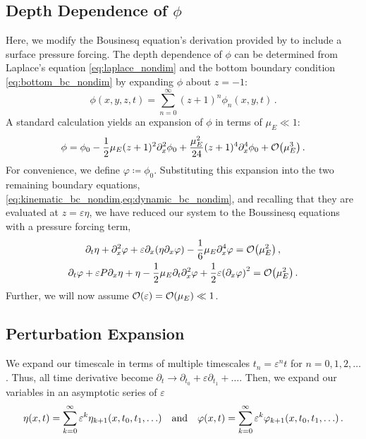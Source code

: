 \documentclass{jfm}
\renewcommand*{\epsilon}{\varepsilon}
\begin{document}
\subsection{Depth Dependence of \texorpdfstring{$\phi$}{Velocity Potential}}
Here, we modify the Bousinesq equation's derivation provided by
\citet{mei2005nonlinear} to include a surface pressure forcing.
The depth dependence of $\phi$ can be determined from Laplace's equation
\cref{eq:laplace_nondim} and the bottom boundary condition
\cref{eq:bottom_bc_nondim} by expanding $\phi$ about $z=-1$:
\begin{equation}
  \phi(x,y,z,t) = \sum_{n=0}^\infty (z+1)^n\phi_n(x,y,t) \,.
\end{equation}
A standard calculation \citep[\eg][]{mei2005nonlinear} yields an
expansion of $\phi$ in terms of $\mu_E \ll 1$:
\begin{equation}
  \phi = \phi_0 - \frac{1}{2}\mu_E (z+1)^2\partial^2_x\phi_0 +
  \frac{\mu_E^2}{24}(z+1)^4\partial^4_x\phi_0 +
  \order{\mu_E^3} \,.
\end{equation}
For convenience, we define $\varphi \coloneqq \phi_0$.
Substituting this expansion into the two remaining boundary equations,
\cref{eq:kinematic_bc_nondim,eq:dynamic_bc_nondim}, and recalling that
they are evaluated at $z=\epsilon \eta$, we have reduced our system to
the Boussinesq equations with a pressure forcing term,
\begin{gather}
  \partial_t \eta + \partial_x^2 \varphi + \epsilon \partial_x
    \pqty{\eta \partial_x \varphi} -\frac{1}{6}\mu_E \partial^4_x
    \varphi = \order{\mu_E^2} \label{eq:kinematic_bc_varphi} \,, \\
  \partial_t \varphi + \epsilon P \partial_x \eta + \eta -
    \frac{1}{2}\mu_E \partial_t \partial_x^2 \varphi +
    \frac{1}{2}\epsilon\pqty{\partial_x \varphi}^2 = \order{\mu_E^2} \,.
    \label{eq:dynamic_bc_varphi}
\end{gather}
Further, we will now assume $\order{\epsilon} = \order{\mu_E} \ll 1$.

\subsection{\label{sec:shallow_water} Perturbation Expansion}
We expand our timescale in terms of multiple timescales $t_n =
\epsilon^n t$ for $n= 0,1,2,\ldots$.
Thus, all time derivative become $\partial_t \to \partial_{t_0} +
\epsilon \partial_{t_1} + \ldots$.
Then, we expand our variables in an asymptotic series of $\epsilon$
\begin{equation}
  \eta(x,t) = \sum_{k=0}^{\infty} \epsilon^k
    \eta_{k+1}(x,t_0,t_1,\ldots) \qq{and}
  \varphi(x,t) = \sum_{k=0}^{\infty} \epsilon^k
    \varphi_{k+1}(x,t_0,t_1,\ldots) \,.
\end{equation}
\end{document}
